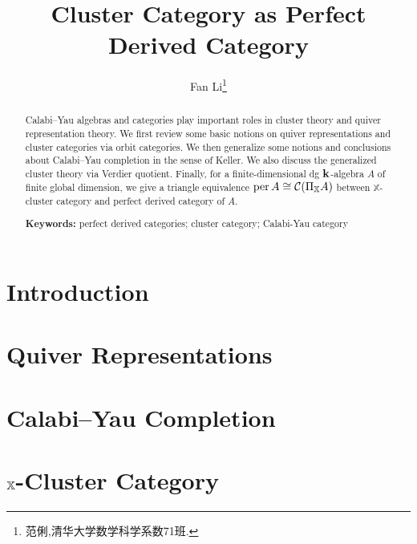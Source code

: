 \documentclass[twoside]{article}
\begin{document}
\title{Cluster Category as Perfect Derived Category}
\author{Fan Li\footnote{范俐,清华大学数学科学系数71班.}}
\begin{abstract}
  Calabi--Yau algebras and categories play important roles in cluster theory
  and quiver representation theory.
  We first review some basic notions on
  quiver representations and cluster categories via orbit categories.
  We then generalize some notions and conclusions about Calabi--Yau completion
  in the sense of Keller.
  We also discuss the generalized cluster theory via Verdier quotient.
  Finally, for a finite-dimensional dg $\mathbf{k}$-algebra $A$ of finite global dimension,
  we give a triangle equivalence $\operatorname{per} A \cong \operatorname{\mathcal{C}}(\Pi_{\mathbb{X}}A)$ between
  $\mathbb{X}$-cluster category and perfect derived category of $A$.

  \bigskip
  \noindent
  \textbf{Keywords:}
  perfect derived categories; cluster category; Calabi-Yau category
\end{abstract}

\tableofcontents

\section{Introduction}


\section{Quiver Representations}


\section{Calabi--Yau Completion}


\section{\texorpdfstring{$\mathbb{X}$}{X}-Cluster Category}


\printbibliography
\end{document}
